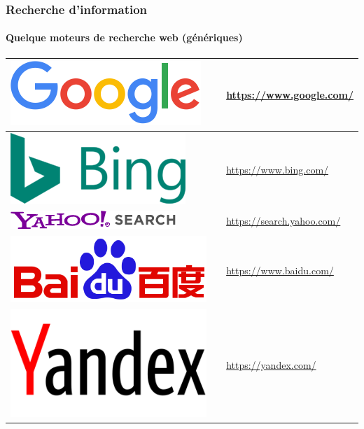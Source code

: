 \documentclass{beamer}
\begin{document}
\begin{frame}
\frametitle{Recherche d'information}
\framesubtitle{Quelque moteurs de recherche web (génériques)}

\def\arraystretch{0}

\begin{tabular}{L{.3\textwidth}{.8cm}cp{.6\textwidth}}%
	
	\hline
	
	\includegraphics[height=.8cm]{..//img/Bweb02-ri-gmail/google-logo.png} &
	& 
	\url{https://www.google.com/}  \\
	
	\hline
	
	\includegraphics[height=.8cm]{..//img/Bweb02-ri-gmail/bing-logo.png} &
	& 
	\url{https://www.bing.com/} \\
	
	\hline
	
	\includegraphics[height=.4cm]{..//img/Bweb02-ri-gmail/yahoo-logo.png} & 
	& 
	\url{https://search.yahoo.com/} \\
	
	\hline
	
	\includegraphics[height=.8cm]{..//img/Bweb02-ri-gmail/baidu-logo.png} & 
	& 
	\url{https://www.baidu.com/} \\
	
	\hline
	
	\includegraphics[height=.8cm]{..//img/Bweb02-ri-gmail/yandex-logo.png} & 
	& 
	\url{https://yandex.com/} \\
	
	\hline
	
\end{tabular}


\end{frame}
\end{document}
